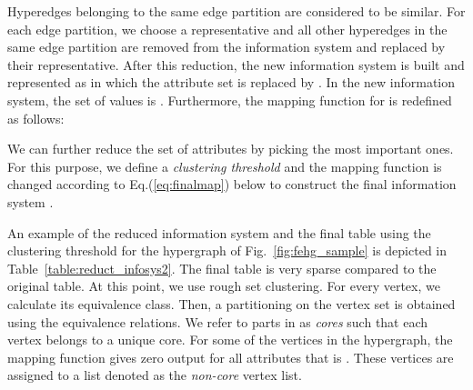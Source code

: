 \documentclass[twocolumn]{svjour3}          \smartqed
\begin{document}
Hyperedges belonging to the same edge partition are considered to be  similar. For each edge partition, we choose a representative and all other hyperedges in the same edge partition are removed from the information system  and replaced by their representative. After this reduction, the new information system is built and represented as  in which the attribute set is replaced by . In the new information system, the set of values is . Furthermore, the mapping function for  is redefined as follows:



We can further reduce the set of attributes by picking the most important ones. For this purpose, we define a \textit{clustering threshold}  and the mapping function is changed according to Eq.(\ref{eq:finalmap}) below to construct the final information system . 



An example of the reduced information system and the final table using the clustering threshold  for the hypergraph of Fig.~\ref{fig:fehg_sample} is depicted in Table~\ref{table:reduct_infosys2}. The final table is very sparse compared to the original table. At this point, we use rough set clustering. For every vertex, we calculate its equivalence class. Then, a partitioning  on the vertex set is obtained using the equivalence relations. We refer to parts in  as \textit{cores} such that each vertex belongs to a unique core. For some of the vertices in the hypergraph, the mapping function gives zero output for all attributes that is . These vertices are assigned to a list denoted as the \textit{non-core} vertex list. 
\end{document}
